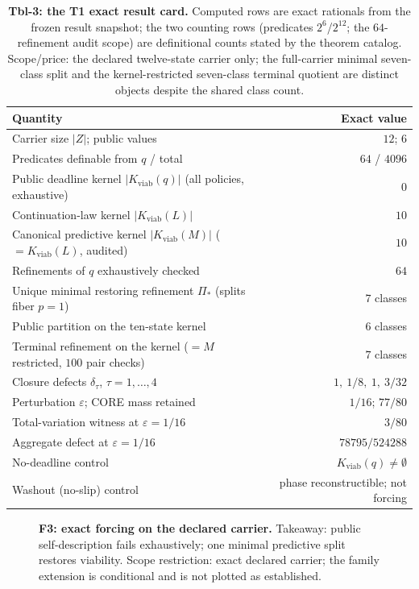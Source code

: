 \documentclass[11pt]{article}
\newcommand{\Kviab}{K_{\mathrm{viab}}}
\theoremstyle{definition}
\begin{document}
\begin{table}[t]
\centering\small
\begin{tabular}{lr}
\toprule
Quantity & Exact value \\
\midrule
Carrier size $|Z|$; public values & $12$; $6$ \\
Predicates definable from $q$ / total & $64$ / $4096$ \\
Public deadline kernel $|\Kviab(q)|$ (all policies, exhaustive) & $0$ \\
Continuation-law kernel $|\Kviab(L)|$ & $10$ \\
Canonical predictive kernel $|\Kviab(M)|$ (${}=\Kviab(L)$, audited) & $10$ \\
Refinements of $q$ exhaustively checked & $64$ \\
Unique minimal restoring refinement $\Pi_*$ (splits fiber $p=1$) & $7$ classes \\
Public partition on the ten-state kernel & $6$ classes \\
Terminal refinement on the kernel (${}=M$ restricted, $100$ pair checks) & $7$ classes \\
Closure defects $\delta_{\tau}$, $\tau=1,\dots,4$ & $1,\ 1/8,\ 1,\ 3/32$ \\
Perturbation $\varepsilon$; CORE mass retained & $1/16$; $77/80$ \\
Total-variation witness at $\varepsilon=1/16$ & $3/80$ \\
Aggregate defect at $\varepsilon=1/16$ & $78795/524288$ \\
No-deadline control & $\Kviab(q)\neq\emptyset$ \\
Washout (no-slip) control & phase reconstructible; not forcing \\
\bottomrule
\end{tabular}
\caption{\textbf{Tbl-3: the T1 exact result card.} Computed rows are exact
rationals from the frozen result snapshot; the two counting rows (predicates
$2^6$/$2^{12}$; the $64$-refinement audit scope) are definitional counts
stated by the theorem catalog. Scope/price: the declared
twelve-state carrier only; the full-carrier minimal seven-class split and the
kernel-restricted seven-class terminal quotient are distinct objects despite
the shared class count.}
\label{tbl:t1}
\end{table}

\begin{figure}[t]
\centering
{}
\caption{\textbf{F3: exact forcing on the declared carrier.} Takeaway: public
self-description fails exhaustively; one minimal predictive split restores
viability. Scope restriction: exact declared carrier; the family extension is
conditional and is not plotted as established.}
\label{fig:t1}
\end{figure}
\end{document}
